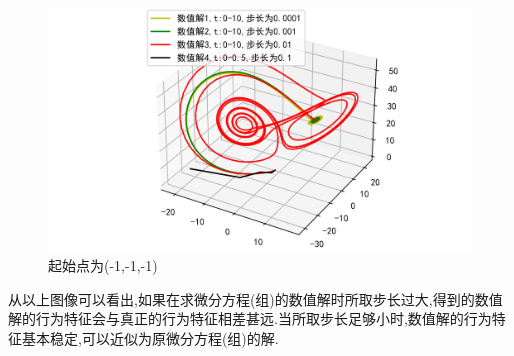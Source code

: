 \documentclass[a4paper]{article}%
\begin{document}
\begin{figure}[H]
    \centering
    \includegraphics[scale=0.8]{85}
    \caption{起始点为(-1,-1,-1)}
\end{figure}
从以上图像可以看出,如果在求微分方程(组)的数值解时所取步长过大,得到的数值解的行为特征会与真正的行为特征相差甚远.当所取步长足够小时,数值解的行为特征基本稳定,可以近似为原微分方程(组)的解.  
\nocite{*}

\end{document}
